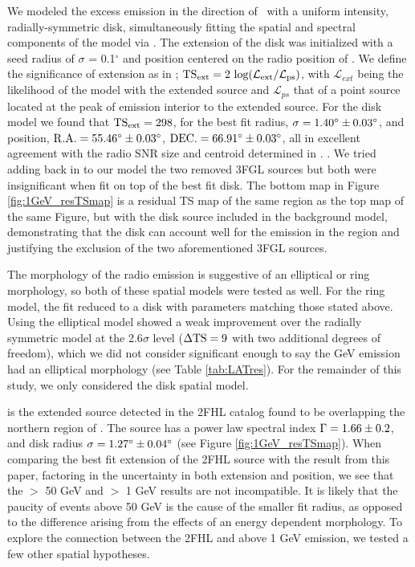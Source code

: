 We modeled the excess emission in the direction of \Gone ~with a uniform intensity, radially-symmetric disk, simultaneously fitting the spatial and spectral components of the model  via \ptlike. The extension of the disk was initialized with a seed radius of $\sigma$ = 0.1$^\circ$ and position centered on the radio position of \Gone. We define the significance of extension as in \cite{Lande12}; ${\rm TS_{ext} = 2~log(\mathcal{L}_{ext} / \mathcal{L}_{ps})}$, with $\mathcal{L}_{ext}$ being the likelihood of the model with the extended source and $\mathcal{L}_{ps}$ that of a point source located at the peak of emission interior to the extended source. For the disk model we found that  ${\rm TS_{ext} = 298}$, for the best fit radius, ${\rm \sigma = 1.40^\circ \pm 0.03^\circ}$, and position,  ${\rm R.A. = 55.46^\circ \pm 0.03^\circ }$, ${\rm DEC. = 66.91^\circ \pm 0.03^\circ }$, all in excellent agreement with the radio SNR size and centroid determined in \cite{Gao14}. . We tried adding back in to our model the two removed 3FGL sources but both were insignificant when fit on top of the best fit disk. The bottom map in Figure \ref{fig:1GeV_resTSmap} is a residual TS map of the same region as the top map of the same Figure, but with the disk source included in the background model, demonstrating that the disk can account well for the emission in the region and justifying the exclusion of the two aforementioned 3FGL sources.

The morphology of the radio emission is suggestive of an elliptical or ring morphology, so both of these spatial models were tested as well. For the ring model, the fit reduced to a disk with parameters matching those stated above. Using the elliptical model showed a weak improvement over the radially symmetric model at the 2.6$\sigma$ level (${\rm \Delta TS = 9}$ with two additional degrees of freedom), which we did not consider significant enough to say the GeV emission had an elliptical morphology (see Table \ref{tab:LATres}). For the remainder of this study, we only considered the disk spatial model.

\ghard{} is the extended source detected in the 2FHL catalog found to be overlapping the northern region of \Gone{} \cite{2FHL}. The source has a power law spectral index ${\rm \Gamma = 1.66 \pm 0.2}$, and disk radius ${\rm \sigma = 1.27^\circ \pm 0.04^\circ}$ (see Figure \ref{fig:1GeV_resTSmap}). When comparing the best fit extension of the 2FHL source with the result from this paper, factoring in the uncertainty in both extension and position, we see that the $>$ 50 GeV and $>$ 1 GeV results are not incompatible. It is likely that the paucity of events above 50 GeV is the cause of the smaller fit radius, as opposed to the difference arising from the effects of an energy dependent morphology. To explore the connection between the 2FHL and above 1 GeV emission, we tested a few other spatial hypotheses.


